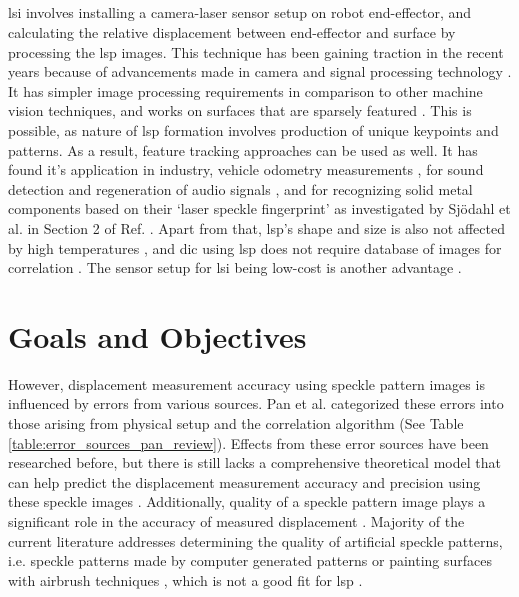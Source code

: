     \subsection*{}
    \gls{lsi} involves installing a camera-laser sensor setup on robot end-effector, and calculating the relative displacement between end-effector and surface by processing the \gls{lsp} images. This technique has been gaining traction in the recent years because of advancements made in camera and signal processing technology \cite{filter, farsad}. It has simpler image processing requirements in comparison to other machine vision techniques, and works on surfaces that are sparsely featured \cite{francis_autonomous}. This is possible, as nature of \gls{lsp} formation involves production of unique keypoints and patterns. As a result, feature tracking approaches can be used as well. It has found it's application in industry, vehicle odometry measurements \cite{charrett_mars}, for sound detection and regeneration of audio signals \cite{nan_wu}, and for recognizing solid metal components based on their `laser speckle fingerprint' as investigated by Sjödahl et al. in Section 2 of Ref. \cite{sjoedahl}. Apart from that, \gls{lsp}'s shape and size is also not affected by high temperatures \cite{song}, and \gls{dic} using \gls{lsp} does not require database of images for correlation \cite{farsad}. The sensor setup for \gls{lsi} being low-cost is another advantage \cite{charrett_2018}.

    
    \section*{Goals and Objectives}
        However, displacement measurement accuracy using speckle pattern images is influenced by errors from various sources. Pan et al. categorized these errors into those arising from physical setup and the correlation algorithm (See Table \ref{table:error_sources_pan_review}). Effects from these error sources have been researched before, but there is still lacks a comprehensive theoretical model that can help predict the displacement measurement accuracy and precision using these speckle images \cite{pan_review}. Additionally, quality of a speckle pattern image plays a significant role in the accuracy of measured displacement \cite{pan_mig, crammond}. Majority of the current literature addresses determining the quality of artificial speckle patterns, i.e. speckle patterns made by computer generated patterns \cite{stoilov} or painting surfaces with airbrush techniques \cite{park}, which is not a good fit for \gls{lsp} \cite{song}. 

